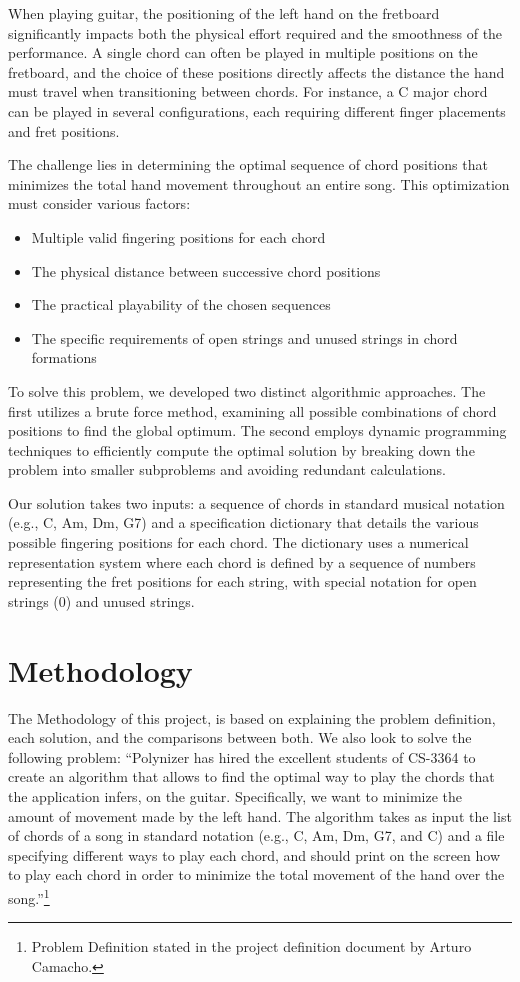 \documentclass[conference]{IEEEtran}
\begin{document}
When playing guitar, the positioning of the left hand on the fretboard significantly impacts both the physical effort required and the smoothness of the performance. A single chord can often be played in multiple positions on the fretboard, and the choice of these positions directly affects the distance the hand must travel when transitioning between chords. For instance, a C major chord can be played in several configurations, each requiring different finger placements and fret positions.

The challenge lies in determining the optimal sequence of chord positions that minimizes the total hand movement throughout an entire song. This optimization must consider various factors:
\begin{itemize}
    \item Multiple valid fingering positions for each chord
    \item The physical distance between successive chord positions
    \item The practical playability of the chosen sequences
    \item The specific requirements of open strings and unused strings in chord formations
\end{itemize}

To solve this problem, we developed two distinct algorithmic approaches. The first utilizes a brute force method, examining all possible combinations of chord positions to find the global optimum. The second employs dynamic programming techniques to efficiently compute the optimal solution by breaking down the problem into smaller subproblems and avoiding redundant calculations.

Our solution takes two inputs: a sequence of chords in standard musical notation (e.g., C, Am, Dm, G7) and a specification dictionary that details the various possible fingering positions for each chord. The dictionary uses a numerical representation system where each chord is defined by a sequence of numbers representing the fret positions for each string, with special notation for open strings (0) and unused strings.

\section{Methodology}
The Methodology of this project, is based on explaining the problem definition, each solution, and the comparisons between both. We also look to solve the following problem:
\newline
\indent``Polynizer has hired the excellent students of CS-3364 to create an algorithm that allows to ﬁnd the optimal way to play the chords that the application infers, on the guitar. Speciﬁcally, we want to minimize the amount of movement made by the left hand. The algorithm takes as input the list of chords of a song in standard notation (e.g., C, Am, Dm, G7, and C) and a ﬁle specifying diﬀerent ways to play each chord, and should print on the screen how to play each chord in order to minimize the total movement of the hand over the song.''\footnote[1]{Problem Definition stated in the project definition document by Arturo Camacho.}
\end{document}
